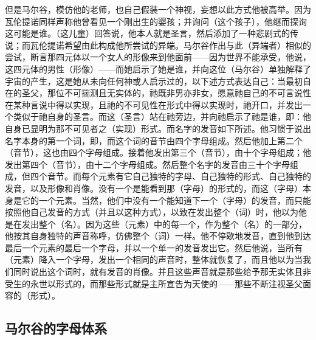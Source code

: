 但是马尔谷，模仿他的老师，也自己假装一个神视，妄想以此方式他被高举。因为瓦伦提诺同样声称他曾看见一个刚出生的婴孩；并询问（这个孩子），他继而探询这可能是谁。（这儿童）回答说，他本人就是圣言，然后添加了一种悲剧式的传说；而瓦伦提诺希望由此构成他所尝试的异端。马尔谷作出与此（异端者）相似的尝试，断言那四元体以一个女人的形像来到他面前——因为世界不能承受，他说，这四元体的男性（形像）——而她启示了她是谁，并向这位（马尔谷）单独解释了宇宙的产生，这是她从未向任何神或人启示过的，以下述方式表达自己：当最初自在的圣父，那位不可揣测且无实体的，祂既非男亦非女，愿意祂自己的不可言说性在某种言说中得以实现，且祂的不可见性在形式中得以实现时，祂开口，并发出一个类似于祂自身的圣言。而这（圣言）站在祂旁边，并向祂启示了祂是谁，即：他自身已显明为那不可见者之（实现）形式。而名字的发音如下所述。他习惯于说出名字本身的第一个词，即，而这个词的音节由四个字母组成。然后他加上第二个（音节），这也由四个字母组成。接着他发出第三个（音节），由十个字母组成；他发出第四个（音节），由十二个字母组成。然后整个名字的发音由三十个字母组成，但四个音节。而每个元素有它自己独特的字母、自己独特的形式、自己独特的发音，以及形像和肖像。没有一个是能看到那（字母）的形式的，而这（字母）本身是它的一个元素。当然，他们中没有一个能知道下一个（字母）的发音，而只能按照他自己发音的方式（并且以这种方式），以致在发出整个（词）时，他以为他是在发出整个（名）。因为这些（元素）中的每一个，作为整个（名）的一部分，他按其自身独特的声音称呼，仿佛整个（词）一样。他不停歇地发音，直到他到达最后一个元素的最后一个字母，并以一个单一的发音发出它。然后他说，当所有（元素）降入一个字母，发出一个相同的声音时，整体就恢复了，而且他以为当我们同时说出这个词时，就有发音的肖像。并且这些声音就是那些给予那无实体且非受生的永世以形式的，而那些形式就是主所宣告为天使的——那些不断注视圣父面容的（形式）。\par


\subsection{马尔谷的字母体系}

